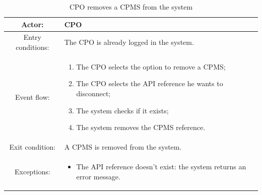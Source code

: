 \begin{table}[h]
    \begin{center}
        \begin{tabular}{|c||p{10cm}|}
            \hline
            Actor:            & \ac{CPO}                                      \\
            \hline
            Entry conditions: & The \ac{CPO} is already logged in the system. \\
            \hline
            Event flow:       &
            \begin{enumerate}
                \item The \ac{CPO} selects the option to remove a \ac{CPMS};
                \item The \ac{CPO} selects the \ac{API} reference he wants to disconnect;
                \item The system checks if it exists;
                \item The system removes the \ac{CPMS} reference.
            \end{enumerate}
            \\
            \hline
            Exit condition:   & A \ac{CPMS} is removed from the system.       \\
            \hline
            Exceptions:       &
            \begin{itemize}
                \item The API reference doesn't exist: the system returns an error message.
            \end{itemize}
            \\
            \hline
        \end{tabular}
    \end{center}
    \caption{\ac{CPO} removes a \ac{CPMS} from the system}
\end{table}

